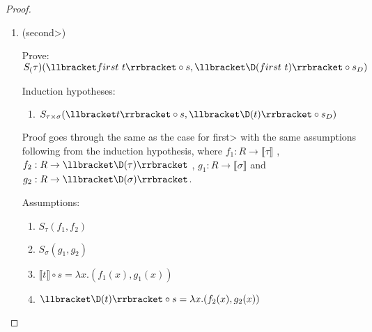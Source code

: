 \begin{proof}
\begin{enumerate}
      \begin{align*}
        S&_{\tau}(\llbracket first\ t \rrbracket \circ s, \llbracket \D(first\ t) \rrbracket \circ s_D) \\
        & \Vdash \text{(Rewrite using definition of $\D$)} \\
        & S_{\tau}(\llbracket first\ t \rrbracket \circ s, \llbracket first\ \D(t) \rrbracket \circ s_D) \\
        & \Vdash \text{(Rewrite using definition of $\llbracket\rrbracket$)} \\
        & S_{\tau}(\lambda x. fst(\llbracket t \rrbracket(s(x))), \lambda x. fst(\llbracket \D(t) \rrbracket(s_D(x)))) \\
        & \Vdash \text{(Rewrite using \ref{eqn:subst_ass_proj1_6} and \ref{eqn:subst_ass_proj1_7})} \\
        & S_{\tau}(\lambda x. fst(f_1(x), g_1(x)), \lambda x. fst(f_2(x), g_2(x))) \\
        & \Vdash \text{($\beta\eta$-equality)} \\
        & S_{\tau}(f_1, f_2) \\
        & \Vdash \text{(Assumption \ref{eqn:subst_ass_proj1_4})} \\
      \end{align*} \qed

      \item (\<second>)

      Prove: $S_(\tau)(\llbracket first\ t \rrbracket \circ s, \llbracket \D(first\ t) \rrbracket \circ s_D)$

      Induction hypotheses:
      \begin{enumerate}
        \item \label{eqn:subst_ih_first}$S_{\tau\times\sigma}(\llbracket t \rrbracket \circ s, \llbracket \D(t) \rrbracket \circ s_D)$
      \end{enumerate}

      Proof goes through the same as the case for \<first> with the same assumptions following from the induction hypothesis, where
      $f_1 : R \rightarrow \llbracket \tau \rrbracket$
      , $f_2 : R \rightarrow \llbracket \D(\tau) \rrbracket$
      , $g_1 : R \rightarrow \llbracket \sigma \rrbracket$
      and $g_2 : R \rightarrow \llbracket \D(\sigma) \rrbracket$.

      Assumptions:
      \begin{enumerate}
        \item \label{eqn:subst_ass_proj2_4} $S_\tau(f_1, f_2)$
        \item \label{eqn:subst_ass_proj2_5} $S_\sigma(g_1, g_2)$
        \item \label{eqn:subst_ass_proj2_6} $\llbracket t \rrbracket \circ s = \lambda x. (f_1(x), g_1(x))$
        \item \label{eqn:subst_ass_proj2_7} $\llbracket \D(t) \rrbracket \circ s = \lambda x. (f_2(x), g_2(x))$
      \end{enumerate}


\end{enumerate}
\end{proof}
